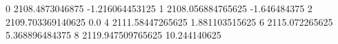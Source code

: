 0 2108.4873046875 -1.216064453125
1 2108.056884765625 -1.646484375
2 2109.703369140625 0.0
4 2111.58447265625 1.881103515625
6 2115.072265625 5.368896484375
8 2119.947509765625 10.244140625
